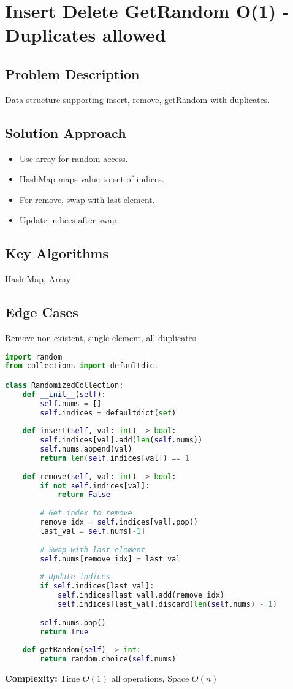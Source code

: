 \documentclass[10pt, a4paper]{article}
\begin{document}
\section{Insert Delete GetRandom O(1) - Duplicates allowed}
\subsection*{Problem Description}
Data structure supporting insert, remove, getRandom with duplicates.

\subsection*{Solution Approach}
\begin{itemize}
    \item Use array for random access.
    \item HashMap maps value to set of indices.
    \item For remove, swap with last element.
    \item Update indices after swap.
\end{itemize}

\subsection*{Key Algorithms}
Hash Map, Array

\subsection*{Edge Cases}
Remove non-existent, single element, all duplicates.

\begin{lstlisting}[language=Python]
import random
from collections import defaultdict

class RandomizedCollection:
    def __init__(self):
        self.nums = []
        self.indices = defaultdict(set)
    
    def insert(self, val: int) -> bool:
        self.indices[val].add(len(self.nums))
        self.nums.append(val)
        return len(self.indices[val]) == 1
    
    def remove(self, val: int) -> bool:
        if not self.indices[val]:
            return False
        
        # Get index to remove
        remove_idx = self.indices[val].pop()
        last_val = self.nums[-1]
        
        # Swap with last element
        self.nums[remove_idx] = last_val
        
        # Update indices
        if self.indices[last_val]:
            self.indices[last_val].add(remove_idx)
            self.indices[last_val].discard(len(self.nums) - 1)
        
        self.nums.pop()
        return True
    
    def getRandom(self) -> int:
        return random.choice(self.nums)
\end{lstlisting}
\textbf{Complexity:} Time $O(1)$ all operations, Space $O(n)$
\end{document}
